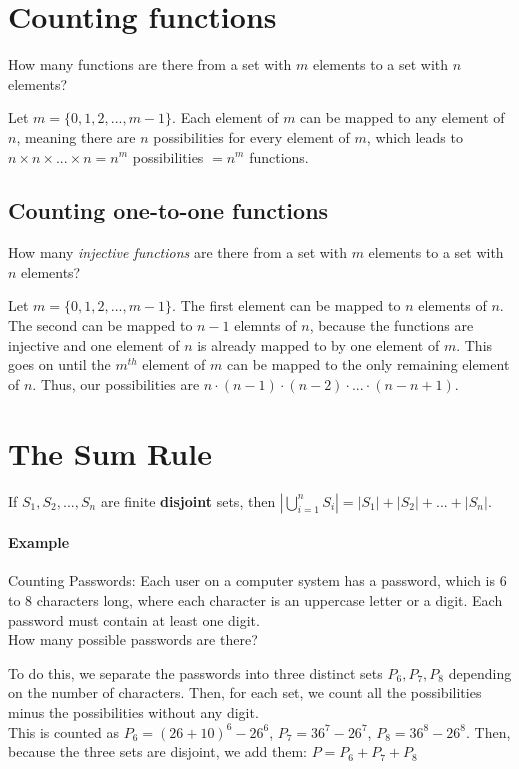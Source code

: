 \documentclass[10pt,a4paper]{book}
\begin{document}
\section{Counting functions}
How many functions are there from a set with $m$ elements to a set with $n$ elements?\par 
Let $m = \{0,1,2,...,m-1\}$. Each element of $m$ can be mapped to any element of $n$, meaning there are $n$ possibilities for every element of $m$, which leads to $n\times n\times ...\times n = n^m$ possibilities $=n^m$ functions.
\subsection{Counting one-to-one functions}
How many \textit{injective functions } are there from a set with $m$ elements to a set with $n$ elements?\par 
Let $m= \{0,1,2,...,m-1\}$. The first element can be mapped to $n$ elements of $n$. The second can be mapped to $n-1$ elemnts of $n$, because the functions are injective and one element of $n$ is already mapped to by one element of $m$. This goes on until the $m^{th}$ element of $m$ can be mapped to the only remaining element of $n$. Thus, our possibilities are $n\cdot (n-1)\cdot (n-2)\cdot ...\cdot (n-n+1)$.
\section{The Sum Rule}
If $S_1,S_2,...,S_n$ are finite \textbf{disjoint} sets, then $|\bigcup_{i=1}^{n} S_i| = |S_1| + |S_2| + ... + |S_n|$.
\paragraph*{Example}
Counting Passwords: Each user on a computer system has a password, which is 6 to 8 characters long, where each character is an uppercase letter or a digit. Each password must contain at least one digit. \\
How many possible passwords are there?\par 
To do this, we separate the passwords into three distinct sets $P_6,P_7,P_8$ depending on the number of characters. Then, for each set, we count all the possibilities minus the possibilities without any digit.\\
This is counted as $P_6=(26+10)^6-26^6$, $P_7=36^7-26^7$, $P_8=36^8-26^8$. Then, because the three sets are disjoint, we add them: $P=P_6+P_7+P_8$

\end{document}
